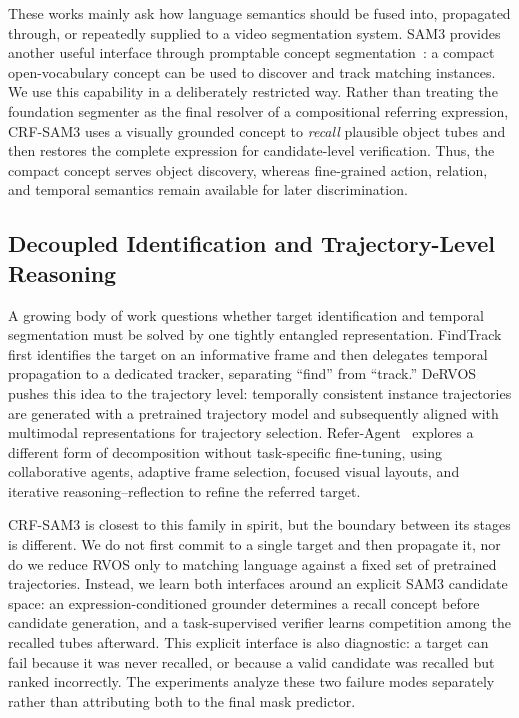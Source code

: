 These works mainly ask how language semantics should be fused into, propagated through, or repeatedly supplied to a video segmentation system. SAM3 provides another useful interface through promptable concept segmentation~\cite{carion2025sam3}: a compact open-vocabulary concept can be used to discover and track matching instances. We use this capability in a deliberately restricted way. Rather than treating the foundation segmenter as the final resolver of a compositional referring expression, CRF-SAM3 uses a visually grounded concept to \emph{recall} plausible object tubes and then restores the complete expression for candidate-level verification. Thus, the compact concept serves object discovery, whereas fine-grained action, relation, and temporal semantics remain available for later discrimination.

\subsection{Decoupled Identification and Trajectory-Level Reasoning}
A growing body of work questions whether target identification and temporal segmentation must be solved by one tightly entangled representation. FindTrack~\cite{cho2025findtrack} first identifies the target on an informative frame and then delegates temporal propagation to a dedicated tracker, separating ``find'' from ``track.'' DeRVOS~\cite{cheng2026dervos} pushes this idea to the trajectory level: temporally consistent instance trajectories are generated with a pretrained trajectory model and subsequently aligned with multimodal representations for trajectory selection. Refer-Agent~\cite{jiang2026referagent} explores a different form of decomposition without task-specific fine-tuning, using collaborative agents, adaptive frame selection, focused visual layouts, and iterative reasoning--reflection to refine the referred target.

CRF-SAM3 is closest to this family in spirit, but the boundary between its stages is different. We do not first commit to a single target and then propagate it, nor do we reduce RVOS only to matching language against a fixed set of pretrained trajectories. Instead, we learn both interfaces around an explicit SAM3 candidate space: an expression-conditioned grounder determines a recall concept before candidate generation, and a task-supervised verifier learns competition among the recalled tubes afterward. This explicit interface is also diagnostic: a target can fail because it was never recalled, or because a valid candidate was recalled but ranked incorrectly. The experiments analyze these two failure modes separately rather than attributing both to the final mask predictor.
